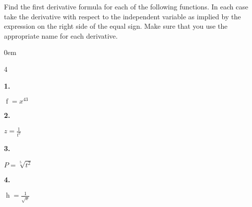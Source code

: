 \documentclass[12pt,]{book}
\theoremstyle{plain}
\theoremstyle{definition}
\numberwithin{equation}{section}
\newenvironment{exercisegroup}%
{\medskip\noindent}%
{\par\bigskip}%
\newlength{\exercisegroupindent}%
\newlength{\exercisegroupitemwidth}%
\newenvironment{exercisegrouplist}%
{\vspace{-\partopsep}%
\begin{adjustwidth}{\exercisegroupindent}{0em}}%
{\end{adjustwidth}%
\vspace{-\partopsep}%
\vspace{\baselineskip}}%
\newenvironment{exercisegroupbycol}[1]%
{\begin{exercisegrouplist}%
\vspace{-\multicolsep}%
\begin{multicols}{#1}%
\setlength{\parindent}{0em}%
\setlength{\exercisegroupitemwidth}{\linewidth}}%
{\end{multicols}%
\vspace{-\multicolsep}%
\end{exercisegrouplist}}%
\newenvironment{exercisegroupitem}[1]%
{\begin{minipage}[t]{\exercisegroupitemwidth}
\vspace{0pt}%
{\bfseries#1}%
\rule{0pt}{\baselineskip}}{\strut%
\end{minipage}%
\hspace{\columnsep}}%
\providecommand\phantomsection{}
\newcommand{\fe}[2]{\mathop{{#1}{\left(#2\right)}}}
\begin{document}
\begin{exercisegroup}%
Find the first derivative formula for each of the following functions.  In each case take the derivative with respect to the independent variable as implied by the expression on the right side of the equal sign.  Make sure that you use the appropriate name for each derivative.%
\begin{exercisegroupbycol}{4}%
\begin{exercisegroupitem}{1. }\phantomsection\hypertarget{exercise-230}{\null}
\(\fe{f}{x}=x^{43}\)%
\end{exercisegroupitem}%
\par%
\begin{exercisegroupitem}{2. }\phantomsection\hypertarget{exercise-231}{\null}
\(z=\frac{1}{t^{7}}\)%
\end{exercisegroupitem}%
\par%
\begin{exercisegroupitem}{3. }\phantomsection\hypertarget{exercise-232}{\null}
\(P=\sqrt[5]{t^2}\)%
\end{exercisegroupitem}%
\par%
\begin{exercisegroupitem}{4. }\phantomsection\hypertarget{exercise-233}{\null}
\(\fe{h}{x}=\frac{1}{\sqrt{x}}\)%
\end{exercisegroupitem}%
\par%
\end{exercisegroupbycol}%
\end{exercisegroup}%
\typeout{************************************************}
\typeout{************************************************}
\end{document}
